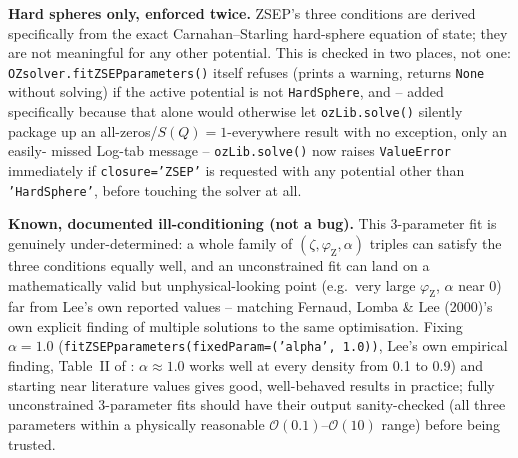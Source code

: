 \documentclass[11pt,a4paper]{article}
\newcommand{\code}[1]{\texttt{#1}}
\begin{document}
\textbf{Hard spheres only, enforced twice.} ZSEP's three conditions are
derived specifically from the exact Carnahan--Starling hard-sphere equation
of state; they are not meaningful for any other potential. This is checked
in two places, not one: \code{OZsolver.fitZSEPparameters()} itself refuses
(prints a warning, returns \code{None} without solving) if the active
potential is not \code{HardSphere}, and -- added specifically because that
alone would otherwise let \code{ozLib.solve()} silently package up an
all-zeros/$S(Q){=}1$-everywhere result with no exception, only an easily-
missed Log-tab message -- \code{ozLib.solve()} now raises \code{ValueError}
immediately if \code{closure='ZSEP'} is requested with any potential other
than \code{'HardSphere'}, before touching the solver at all.

\textbf{Known, documented ill-conditioning (not a bug).} This 3-parameter
fit is genuinely under-determined: a whole family of
$(\zeta,\varphi_{\mathrm{Z}},\alpha)$ triples can satisfy the three
conditions equally well, and an unconstrained fit can land on a
mathematically valid but unphysical-looking point (e.g.\ very large
$\varphi_{\mathrm{Z}}$, $\alpha$ near 0) far from Lee's own reported values
-- matching Fernaud, Lomba \& Lee (2000)'s \cite{fernaud2000} own explicit
finding of multiple solutions to the same optimisation. Fixing
$\alpha=1.0$ (\code{fitZSEPparameters(fixedParam=('alpha', 1.0))}, Lee's own
empirical finding, Table~II of \cite{lee1995}: $\alpha\approx1.0$ works well
at every density from 0.1 to 0.9) and starting near literature values gives
good, well-behaved results in practice; fully unconstrained 3-parameter fits
should have their output sanity-checked (all three parameters within a
physically reasonable $\mathcal{O}(0.1)$--$\mathcal{O}(10)$ range) before
being trusted.
\end{document}
